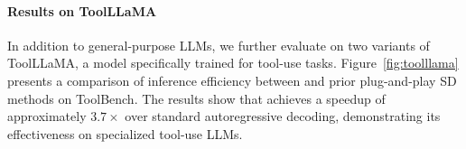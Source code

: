\paragraph{Results on ToolLLaMA}
In addition to general-purpose LLMs, we further evaluate \method on two variants of ToolLLaMA, a model specifically trained for tool-use tasks. Figure~\ref{fig:toolllama} presents a comparison of inference efficiency between \method and prior plug-and-play SD methods on ToolBench. The results show that \method achieves a speedup of approximately $3.7\times$ over standard autoregressive decoding, demonstrating its effectiveness on specialized tool-use LLMs.